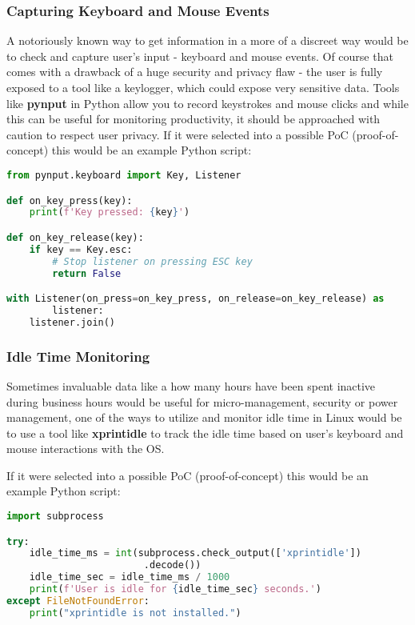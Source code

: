 \documentclass{VUMIFPSmagistrinis}
\begin{document}
\subsubsection{Capturing Keyboard and Mouse Events}
A notoriously known way to get information in a more of a discreet way would be to check and capture user's input - keyboard and mouse events. Of course that comes with a drawback of a huge security and privacy flaw - the user is fully exposed to a tool like a keylogger, which could expose very sensitive data. Tools like \textbf{pynput} in Python allow you to record keystrokes and mouse clicks and while this can be useful for monitoring productivity, it should be approached with caution to respect user privacy. If it were selected into a possible PoC (proof-of-concept) this would be an example Python script:
\begin{lstlisting}[language=Python]
from pynput.keyboard import Key, Listener

def on_key_press(key):
    print(f'Key pressed: {key}')

def on_key_release(key):
    if key == Key.esc:
        # Stop listener on pressing ESC key
        return False

with Listener(on_press=on_key_press, on_release=on_key_release) as 
        listener:
    listener.join()
\end{lstlisting}

\subsubsection{Idle Time Monitoring}
Sometimes invaluable data like a how many hours have been spent inactive during business hours would be useful for micro-management, security or power management, one of the ways to utilize and monitor idle time in Linux would be to use a tool like \textbf{xprintidle} to track the idle time based on user's keyboard and mouse interactions with the OS.

If it were selected into a possible PoC (proof-of-concept) this would be an example Python script:
\begin{lstlisting}[language=Python]
import subprocess

try:
    idle_time_ms = int(subprocess.check_output(['xprintidle'])
                        .decode())
    idle_time_sec = idle_time_ms / 1000
    print(f'User is idle for {idle_time_sec} seconds.')
except FileNotFoundError:
    print("xprintidle is not installed.")
\end{lstlisting}
\end{document}
